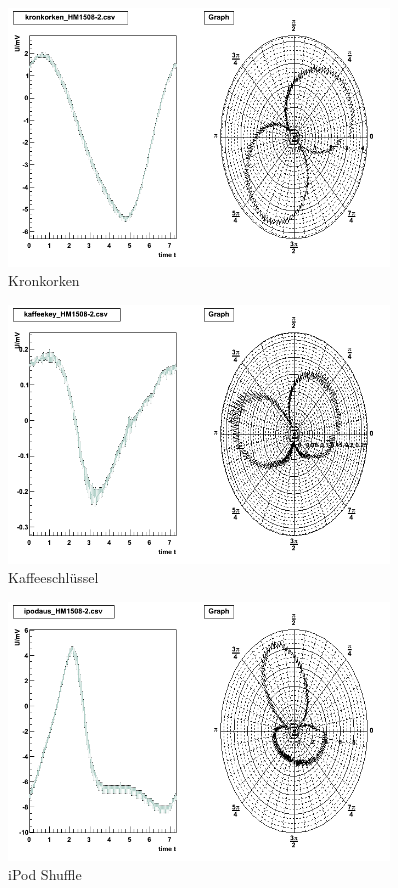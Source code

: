 \begin{appendix}
\begin{figure}[H]
	\centering \includegraphics[width=0.9\textwidth]{Auswertung/Proben-polar/kronkorken.png}
	\caption{Kronkorken}
\end{figure}

\begin{figure}[H]
	\centering \includegraphics[width=0.9\textwidth]{Auswertung/Proben-polar/kaffeekey.png}
	\caption{Kaffeeschlüssel}
\end{figure}

\begin{figure}[H]
	\centering \includegraphics[width=0.9\textwidth]{Auswertung/Proben-polar/ipodaus.png}
	\caption{iPod Shuffle}
\end{figure}


\end{appendix}

